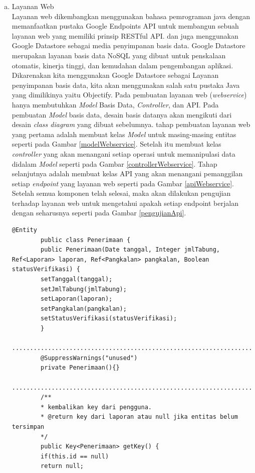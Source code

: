 	\begin{enumerate}[a.]
		\item Layanan Web
		\\ Layanan web dikembangkan menggunakan bahasa pemrograman java dengan memanfaatkan pustaka Google Endpoints API untuk membangun sebuah layanan web yang memiliki prinsip RESTful API. dan juga menggunakan Google Datastore sebagai media penyimpanan basis data. Google Datastore merupakan layanan basis data NoSQL yang dibuat untuk penskalaan otomatis, kinerja tinggi, dan kemudahan dalam pengembangan aplikasi. Dikarenakan kita menggunakan Google Datastore sebagai Layanan penyimpanan basis data, kita akan menggunakan salah satu pustaka Java yang dimilikinya yaitu Objectify. Pada pembuatan layanan web (\textit{webservice}) hanya membutuhkan \textit{Model} Basis Data, \textit{Controller}, dan API. Pada pembuatan \textit{Model} basis data, desain basis datanya akan mengikuti dari desain \textit{class diagram} yang dibuat sebelumnya. tahap pembuatan layanan web yang pertama adalah membuat kelas \textit{Model} untuk masing-masing entitas seperti pada Gambar \ref{modelWebservice}. Setelah itu membuat kelas \textit{controller} yang akan menangani setiap operasi untuk memanipulasi data didalam \textit{Model} seperti pada Gambar \ref{controllerWebservice}. Tahap selanjutnya adalah membuat kelas API yang akan menangani pemanggilan setiap \textit{endpoint} yang layanan web seperti pada Gambar \ref{apiWebservice}. Setelah semua komponen telah selesai, maka akan dilakukan pengujian terhadap layanan web untuk mengetahui apakah setiap endpoint berjalan dengan seharusnya seperti pada Gambar \ref{pengujianApi}.
		
	
		\begin{lstlisting}[caption=Potongan kode \textit{model} basis data layanan web, label=modelWebservice]
		@Entity
		public class Penerimaan {
		public Penerimaan(Date tanggal, Integer jmlTabung, Ref<Laporan> laporan, Ref<Pangkalan> pangkalan, Boolean statusVerifikasi) {
		setTanggal(tanggal);
		setJmlTabung(jmlTabung);
		setLaporan(laporan);
		setPangkalan(pangkalan);
		setStatusVerifikasi(statusVerifikasi);
		}
		.......................................................................
		@SuppressWarnings("unused")
		private Penerimaan(){}
		.......................................................................
		/**
		* kembalikan key dari pengguna.
		* @return key dari laporan atau null jika entitas belum tersimpan
		*/
		public Key<Penerimaan> getKey() {
		if(this.id == null)
		return null;
		

\end{lstlisting}
\end{enumerate}
